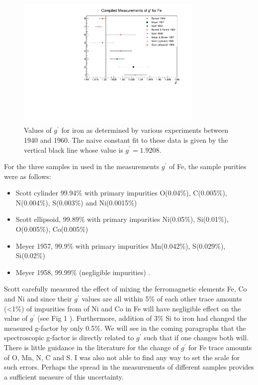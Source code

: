 \documentclass[12pt]{article}
\begin{document}
\begin{figure}[h]
\centering
\includegraphics[width=0.8\textwidth]{gprime_world_data_Fe.pdf}
\caption{Values of $g^{\prime}$ for iron as determined by various experiments between 1940 and 1960. The naive constant fit to these data is given by the vertical black line whose value is $g^{\prime}=1.9208$.}
\label{fig:gprime_world_data_Fe}
\end{figure}

For the three samples in used in the measurements $g^{\prime}$ of Fe, the sample purities were as follows: 
\begin{itemize}
\item{Scott cylinder 99.94\% with primary impurities O(0.04\%), C(0.005\%), N(0.004\%), S(0.003\%) and Ni(0.0015\%) \cite{Scott1951}}
\item{Scott ellipsoid, 99.89\% with primary impurities Ni(0.05\%), Si(0.01\%), O(0.005\%), Co(0.005\%) \cite{Scott1960}}
\item{ Meyer 1957, 99.9\% with primary impurities Mn(0.042\%), S(0.029\%), Si(0.02\%) \cite{Meyer1957}}
\item{ Meyer 1958, 99.99\% (negligible impurities) \cite{Meyer1961}}. 
\end{itemize}

Scott carefully measured the effect of mixing the ferromagnetic elements Fe, Co and Ni and since their $g^{\prime}$ values are all within 5\% of each other trace amounts (<1\%) of impurities from of Ni and Co in Fe will have negligible effect on the value of  $g^{\prime}$ (see Fig 1 \cite{Scott1969}). Furthermore, addition of 3\% Si to iron had changed the measured g-factor by only 0.5\%. We will see in the coming paragraphs that the spectroscopic g-factor is directly related to $g^{\prime}$ such that if one changes both will. There is little guidance in the literature for the change of $g^{\prime}$ for Fe trace amounts of O, Mn, N, C and S. I was also not able to find any way to set the scale for such errors. Perhaps the spread in the measurements of different samples provides a sufficient measure of this uncertainty. 
\end{document}
